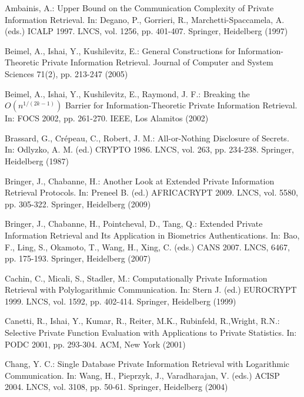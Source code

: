 \documentclass[JMC]{degruyter-journal}
\begin{document}
\begin{thebibliography}{00}

Ambainis, A.: Upper Bound on the Communication Complexity of Private
Information Retrieval. In:  Degano, P., Gorrieri, R.,
Marchetti-Spaccamela, A.   (eds.)  ICALP 1997. LNCS, vol. 1256,  pp.
401-407. Springer, Heidelberg (1997)


 Beimel, A., Ishai, Y., Kushilevitz, E.:
General Constructions for Information-Theoretic Private Information
Retrieval. Journal of Computer and System Sciences 71(2), pp.
213-247 (2005)

Beimel, A., Ishai, Y., Kushilevitz, E., Raymond, J. F.: Breaking the
$O(n^{1/(2k-1)})$ Barrier for Information-Theoretic Private
Information Retrieval. In:  FOCS 2002,  pp. 261-270. IEEE, Los
Alamitos (2002)


Brassard, G., Cr{\'{e}}peau, C., Robert, J. M.: All-or-Nothing
Disclosure of Secrets. In:  Odlyzko, A. M. (ed.) CRYPTO 1986. LNCS,
vol. 263, pp. 234-238.  Springer, Heidelberg (1987)


Bringer, J., Chabanne, H.: Another Look at Extended Private
Information Retrieval Protocols. In: Preneel B. (ed.) AFRICACRYPT
2009. LNCS, vol.  5580, pp. 305-322. Springer, Heidelberg (2009)

Bringer, J., Chabanne, H.,  Pointcheval, D.,  Tang, Q.: Extended
Private Information Retrieval and Its Application in Biometrics
Authentications. In:  Bao, F., Ling, S.,  Okamoto, T., Wang, H.,
Xing, C. (eds.)  CANS 2007. LNCS, 6467, pp. 175-193.  Springer,
Heidelberg (2007)




Cachin, C., Micali, S., Stadler, M.: Computationally Private
Information Retrieval with Polylogarithmic Communication. In: Stern
J. (ed.) EUROCRYPT 1999. LNCS, vol. 1592, pp. 402-414.  Springer,
Heidelberg (1999)

Canetti, R., Ishai, Y., Kumar, R., Reiter, M.K., Rubinfeld,
R.,Wright, R.N.: Selective Private Function Evaluation with
Applications to Private Statistics. In:  PODC 2001, pp. 293-304.
ACM, New York  (2001)




Chang, Y. C.: Single Database Private Information Retrieval with
Logarithmic Communication. In: Wang, H.,  Pieprzyk, J.,
Varadharajan, V. (eds.)  ACISP 2004. LNCS, vol. 3108, pp. 50-61.
Springer, Heidelberg (2004)




\end{thebibliography}
\end{document}
